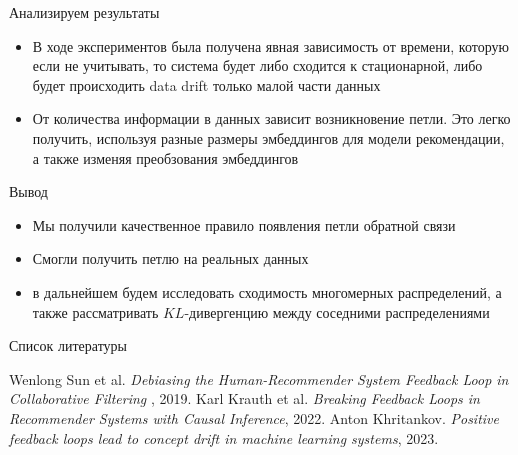 \documentclass{beamer}
\begin{document}
\begin{frame}{Анализируем результаты}
\begin{itemize}

\item В ходе экспериментов была получена явная зависимость от времени, которую если не учитывать, то система будет либо сходится к стационарной, либо будет происходить data drift только малой части данных

\item От количества информации в данных зависит возникновение петли. Это легко получить, используя разные размеры эмбеддингов для модели рекомендации, а также изменяя преобзования эмбеддингов

\end{itemize}
\end{frame}

\begin{frame}{Вывод}
\begin{itemize}

\item Мы получили качественное правило появления петли обратной связи

\item Смогли получить петлю на реальных данных

\item в дальнейшем будем исследовать сходимость многомерных распределений, а также рассматривать $KL$-дивергенцию между соседними распределениями
\end{itemize}
\end{frame}

\begin{frame}{Список литературы}
    \scriptsize
    \begin{thebibliography}{9}
         Wenlong Sun et al. \textit{Debiasing the Human-Recommender System Feedback Loop in
Collaborative Filtering }, 2019.
         Karl Krauth et al. \textit{Breaking Feedback Loops in Recommender Systems with Causal Inference}, 2022.
         Anton Khritankov. \textit{Positive feedback loops lead to concept drift in machine learning systems}, 2023.


    \end{thebibliography}
\end{frame}
\end{document}
